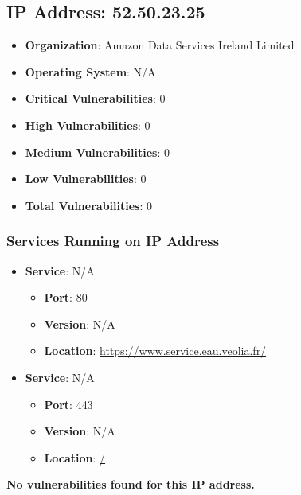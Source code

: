 \documentclass{article}
\begin{document}
\subsection{IP Address: 52.50.23.25}

\begin{itemize}
    \item \textbf{Organization}: Amazon Data Services Ireland Limited
    \item \textbf{Operating System}:  N/A 
    \item \textbf{Critical Vulnerabilities}: 0
    \item \textbf{High Vulnerabilities}: 0
    \item \textbf{Medium Vulnerabilities}: 0
    \item \textbf{Low Vulnerabilities}: 0
    \item \textbf{Total Vulnerabilities}: 0
\end{itemize}

\subsubsection*{Services Running on IP Address}

\begin{itemize}
    
        \item \textbf{Service}: N/A
        \begin{itemize}
            \item \textbf{Port}: 80
            \item \textbf{Version}:  N/A 
            \item \textbf{Location}: \href{ https://www.service.eau.veolia.fr/ }{ https://www.service.eau.veolia.fr/ }
        \end{itemize}
    
        \item \textbf{Service}: N/A
        \begin{itemize}
            \item \textbf{Port}: 443
            \item \textbf{Version}:  N/A 
            \item \textbf{Location}: \href{ / }{ / }
        \end{itemize}
    
\end{itemize}


\textbf{No vulnerabilities found for this IP address.}
\end{document}
